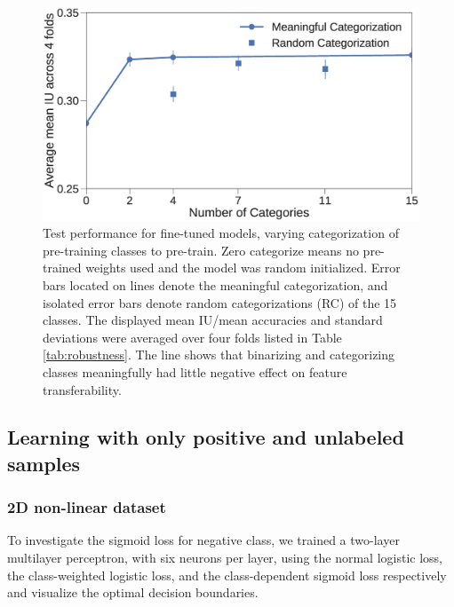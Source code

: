 \begin{figure}[t]
\centering
   \includegraphics[width=1.\linewidth]{img/num_classes.eps}
\caption{
Test performance for fine-tuned models, varying categorization of pre-training classes to pre-train.
Zero categorize means no pre-trained weights used and the model was random initialized.
Error bars located on lines denote the meaningful categorization, and isolated error bars denote random categorizations (RC) of the 15 classes.
The displayed mean IU/mean accuracies and standard deviations were averaged over four folds listed in Table \ref{tab:robustness}.
The line shows that binarizing and categorizing classes meaningfully had little negative effect on feature transferability.
}
\label{fig:categories}
\end{figure}



\subsection{Learning with only positive and unlabeled samples}
\label{subsec:pulearning}


\subsubsection{2D non-linear dataset}

To investigate the sigmoid loss for negative class, we trained a two-layer multilayer perceptron, with six neurons per layer, using the normal logistic loss, the class-weighted logistic loss, and the class-dependent sigmoid loss respectively and visualize the optimal decision boundaries.

